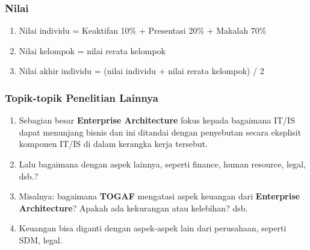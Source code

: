 \documentclass[aspectratio=169]{beamer}
\begin{document}
		\begin{frame}
		\frametitle{Nilai}
		\begin{enumerate}
			\item Nilai individu = Keaktifan 10\% + Presentasi 20\% + Makalah 70\%
			\item Nilai kelompok = nilai rerata kelompok
			\item Nilai akhir individu = (nilai individu + nilai rerata kelompok) / 2
		\end{enumerate}
	\end{frame}
	
	\begin{frame}
		\frametitle{Topik-topik Penelitian Lainnya}
		\begin{enumerate}
			\item Sebagian besar \textbf{Enterprise Architecture} fokus kepada bagaimana IT/IS dapat menunjang bisnis dan ini ditandai dengan penyebutan secara eksplisit komponen IT/IS di dalam kerangka kerja tersebut.
			\item Lalu bagaimana dengan aspek lainnya, seperti finance, human resource, legal, dsb.?
			\item Misalnya: bagaimana \textbf{TOGAF} mengatasi aspek keuangan dari \textbf{Enterprise Architecture}? Apakah ada kekurangan atau kelebihan? dsb.
			\item Keuangan bisa diganti dengan aspek-aspek lain dari perusahaan, seperti SDM, legal.
		\end{enumerate}
	\end{frame}
	
\end{document}
